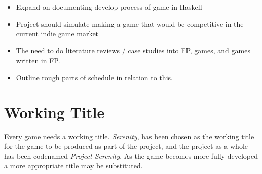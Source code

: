 \begin{itemize}\itemsep-3pt
	\item Expand on documenting develop process of game in Haskell
	\item Project should simulate making a game that would be competitive in the current indie game market
	\item The need to do literature reviews / case studies into FP, games, and games written in FP.
	\item Outline rough parts of schedule in relation to this.
\end{itemize}




\section{Working Title}

Every game needs a working title. \emph{Serenity}, has been chosen as the working title for the game to be produced as part of the project, and the project as a whole has been codenamed \emph{Project Serenity}. As the game becomes more fully developed a more appropriate title may be substituted.